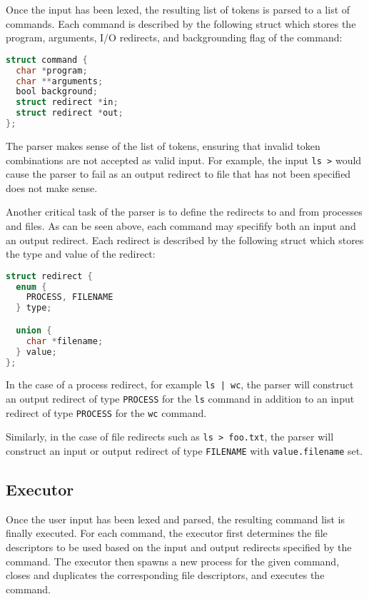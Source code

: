 Once the input has been lexed, the resulting list of tokens is parsed to a list of commands. Each command is described by the following struct which stores the program, arguments, I/O redirects, and backgrounding flag of the command:

\begin{lstlisting}[language=C]
struct command {
  char *program;
  char **arguments;
  bool background;
  struct redirect *in;
  struct redirect *out;
};
\end{lstlisting}

The parser makes sense of the list of tokens, ensuring that invalid token combinations are not accepted as valid input. For example, the input \texttt{ls >} would cause the parser to fail as an output redirect to file that has not been specified does not make sense.

Another critical task of the parser is to define the redirects to and from processes and files. As can be seen above, each command may specifify both an input and an output redirect. Each redirect is described by the following struct which stores the type and value of the redirect:

\begin{lstlisting}[language=C]
struct redirect {
  enum {
    PROCESS, FILENAME
  } type;

  union {
    char *filename;
  } value;
};
\end{lstlisting}

In the case of a process redirect, for example \texttt{ls | wc}, the parser will construct an output redirect of type \texttt{PROCESS} for the \texttt{ls} command in addition to an input redirect of type \texttt{PROCESS} for the \texttt{wc} command.

Similarly, in the case of file redirects such as \texttt{ls > foo.txt}, the parser will construct an input or output redirect of type \texttt{FILENAME} with \texttt{value.filename} set.

\subsection{Executor}

Once the user input has been lexed and parsed, the resulting command list is finally executed. For each command, the executor first determines the file descriptors to be used based on the input and output redirects specified by the command. The executor then spawns a new process for the given command, closes and duplicates the corresponding file descriptors, and executes the command.

